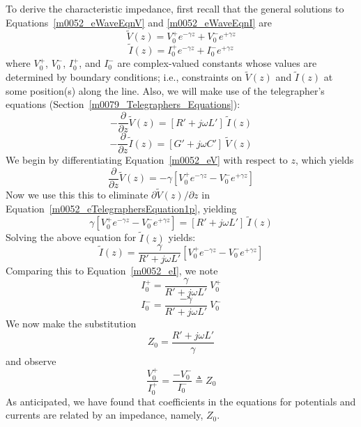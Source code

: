 To derive the characteristic impedance, first recall that the general solutions to Equations~\ref{m0052_eWaveEqnV} and \ref{m0052_eWaveEqnI} are
%
\begin{equation}
\widetilde{V}(z) = V_0^+ e^{-\gamma z} + V_0^- e^{+\gamma z}
\label{m0052_eV}
\end{equation}
%
\begin{equation}
\widetilde{I}(z) = I_0^+ e^{-\gamma z} + I_0^- e^{+\gamma z}
\label{m0052_eI}
\end{equation}
%
where $V_0^+$, $V_0^-$, $I_0^+$, and $I_0^-$ are complex-valued constants whose values are determined by boundary conditions; i.e., constraints on $\widetilde{V}(z)$ and $\widetilde{I}(z)$ at some position(s) along the line.  
Also, we will make use of the telegrapher's equations (Section~\ref{m0079_Telegraphers_Equations}):
%
%
\begin{equation}
-\frac{\partial}{\partial z} \widetilde{V}(z) = \left[ R' + j\omega L' \right]~\widetilde{I}(z)
\label{m0052_eTelegraphersEquation1p}
\end{equation}
%
\begin{equation}
-\frac{\partial}{\partial z} \widetilde{I}(z) = \left[ G' + j\omega C' \right]~\widetilde{V}(z)
\label{m0052_eTelegraphersEquation2p}
\end{equation}
%
We begin by differentiating Equation~\ref{m0052_eV} with respect to $z$, which yields
%
\begin{equation}
\frac{\partial}{\partial z}\widetilde{V}(z) = -\gamma\left[V_0^+ e^{-\gamma z} - V_0^- e^{+\gamma z}\right]
\end{equation}
%
Now we use this this to eliminate $\partial\widetilde{V}(z)/\partial z$ in Equation~\ref{m0052_eTelegraphersEquation1p}, yielding
%
\begin{equation}
\gamma\left[V_0^+ e^{-\gamma z} - V_0^- e^{+\gamma z}\right] = \left[ R' + j\omega L' \right]~\widetilde{I}(z)
\end{equation}
%
Solving the above equation for $\widetilde{I}(z)$ yields:
%
\begin{equation}
\widetilde{I}(z) = \frac{\gamma}{R' + j\omega L'}\left[V_0^+ e^{-\gamma z} - V_0^- e^{+\gamma z}\right]
\end{equation}
%
Comparing this to Equation~\ref{m0052_eI}, we note
%
\begin{equation}
I_0^+ = \frac{\gamma}{R' + j\omega L'}~V_0^+
\end{equation}
%
\begin{equation}
I_0^- = \frac{-\gamma}{R' + j\omega L'}~V_0^-
\end{equation}
%
We now make the substitution
%
\begin{equation}
Z_0 = \frac{R' + j\omega L'}{\gamma} 
\label{m0052_eZ0}
\end{equation}
%
and observe
%
\begin{equation}
\boxed{
\frac{V_0^+}{I_0^+} = \frac{-V_0^-}{I_0^-} \triangleq Z_0
}
\end{equation}
%
As anticipated, we have found that coefficients in the equations for potentials and currents are related by an impedance, namely, $Z_0$.  

